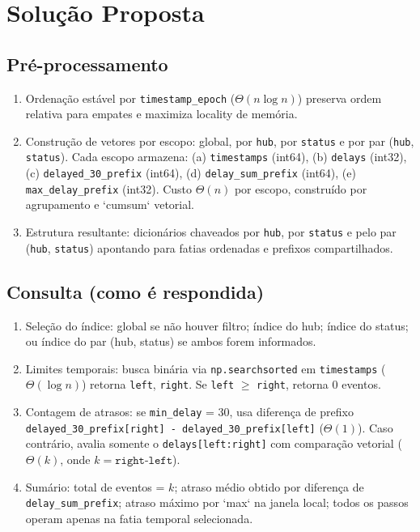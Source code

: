 \documentclass[12pt]{article}
\begin{document}
\section{Solução Proposta}
\subsection{Pré-processamento}
\begin{enumerate}
  \item Ordenação estável por \texttt{timestamp\_epoch} ($\Theta(n \log n)$) preserva ordem relativa para empates e maximiza locality de memória.
  \item Construção de vetores por escopo: global, por \texttt{hub}, por \texttt{status} e por par (\texttt{hub}, \texttt{status}). Cada escopo armazena: (a) \texttt{timestamps} (int64), (b) \texttt{delays} (int32), (c) \texttt{delayed\_30\_prefix} (int64), (d) \texttt{delay\_sum\_prefix} (int64), (e) \texttt{max\_delay\_prefix} (int32). Custo $\Theta(n)$ por escopo, construído por agrupamento e `cumsum` vetorial.
  \item Estrutura resultante: dicionários chaveados por \texttt{hub}, por \texttt{status} e pelo par (\texttt{hub}, \texttt{status}) apontando para fatias ordenadas e prefixos compartilhados.
\end{enumerate}

\subsection{Consulta (como é respondida)}
\begin{enumerate}
  \item Seleção do índice: global se não houver filtro; índice do hub; índice do status; ou índice do par (hub, status) se ambos forem informados.
  \item Limites temporais: busca binária via \texttt{np.searchsorted} em \texttt{timestamps} ($\Theta(\log n)$) retorna \texttt{left}, \texttt{right}. Se \texttt{left} $\geq$ \texttt{right}, retorna 0 eventos.
  \item Contagem de atrasos: se \texttt{min\_delay} = 30, usa diferença de prefixo \texttt{delayed\_30\_prefix[right] - delayed\_30\_prefix[left]} ($\Theta(1)$). Caso contrário, avalia somente o \texttt{delays[left:right]} com comparação vetorial ($\Theta(k)$, onde $k = \texttt{right-left}$).
  \item Sumário: total de eventos = $k$; atraso médio obtido por diferença de \texttt{delay\_sum\_prefix}; atraso máximo por `max` na janela local; todos os passos operam apenas na fatia temporal selecionada.
\end{enumerate}
\end{document}
